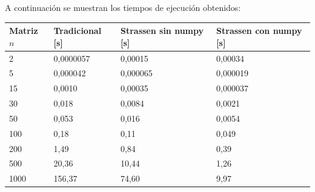 \documentclass[a4paper,11pt]{article}
\begin{document}
A continuación se muestran los tiempos de ejecución obtenidos:
\begin{table}[h]
\centering
\begin{tabular}{|l|l|l|l|}
\hline
\textbf{Matriz $n$} & \textbf{Tradicional [s]} & \textbf{Strassen sin numpy [s]} & \textbf{Strassen con numpy [s]} \\ \hline
2                                         & 0,0000057                                         & 0,00015                                & 0,00034                       \\ \hline
5                                         & 0,000042                                          & 0,000065                               & 0,000019                      \\ \hline
15                                        & 0,0010                                            & 0,00035                                & 0,000037                      \\ \hline
30                                        & 0,018                                             & 0,0084                                 & 0,0021                        \\ \hline
50                                        & 0,053                                             & 0,016                                  & 0,0054                        \\ \hline
100                                       & 0,18                                              & 0,11                                   & 0,049                         \\ \hline
200                                       & 1,49                                              & 0,84                                   & 0,39                          \\ \hline
500                                       & 20,36                                             & 10,44                                  & 1,26                          \\ \hline
1000                                      & 156,37                                            & 74,60                                  & 9,97                          \\ \hline
\end{tabular}
\end{table}\\
\end{document}
